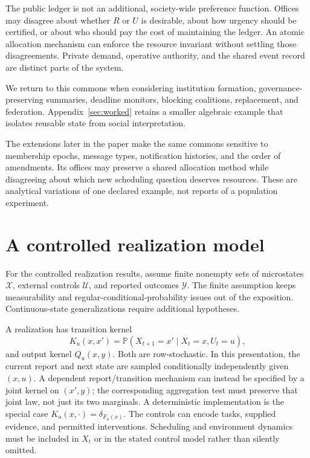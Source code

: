 \documentclass[11pt,letterpaper]{article}
\theoremstyle{plain}
\theoremstyle{definition}
\theoremstyle{remark}
\newcommand{\X}{\mathcal X}
\newcommand{\U}{\mathcal U}
\newcommand{\Y}{\mathcal Y}
\newcommand{\Prob}{\mathbb P}
\begin{document}
The public ledger is not an additional, society-wide preference function. Offices may disagree about whether $R$ or $U$ is desirable, about how urgency should be certified, or about who should pay the cost of maintaining the ledger. An atomic allocation mechanism can enforce the resource invariant without settling those disagreements. Private demand, operative authority, and the shared event record are distinct parts of the system.

We return to this commons when considering institution formation, governance-preserving summaries, deadline monitors, blocking coalitions, replacement, and federation. Appendix~\ref{sec:worked} retains a smaller algebraic example that isolates reusable state from social interpretation.

The extensions later in the paper make the same commons sensitive to membership epochs, message types, notification histories, and the order of amendments. Its offices may preserve a shared allocation method while disagreeing about which new scheduling question deserves resources. These are analytical variations of one declared example, not reports of a population experiment.

\section{A controlled realization model}\label{sec:model}
For the controlled realization results, assume finite nonempty sets of microstates $\X$, external controls $\U$, and reported outcomes $\Y$. The finite assumption keeps measurability and regular-conditional-probability issues out of the exposition. Continuous-state generalizations require additional hypotheses.

A realization has transition kernel
\begin{equation}\label{eq:micro}
K_u(x,x')=\Prob(X_{t+1}=x'\mid X_t=x,U_t=u),
\end{equation}
and output kernel $Q_u(x,y)$. Both are row-stochastic. In this presentation, the current report and next state are sampled conditionally independently given $(x,u)$. A dependent report/transition mechanism can instead be specified by a joint kernel on $(x',y)$; the corresponding aggregation test must preserve that joint law, not just its two marginals. A deterministic implementation is the special case $K_u(x,\cdot)=\delta_{F_u(x)}$. The controls can encode tasks, supplied evidence, and permitted interventions. Scheduling and environment dynamics must be included in $X_t$ or in the stated control model rather than silently omitted.
\end{document}
